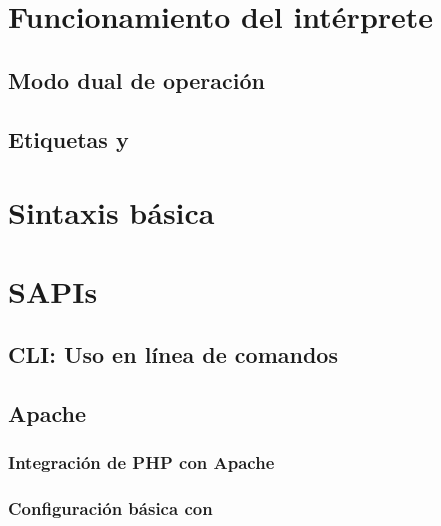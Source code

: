 \documentclass[a4paper,11pt,spanish]{sphinxmanual}
\begin{document}
\section{Funcionamiento del intérprete}
\label{\detokenize{conceptos-basicos-de-php:funcionamiento-del-interprete}}

\subsection{Modo dual de operación}
\label{\detokenize{conceptos-basicos-de-php:modo-dual-de-operacion}}

\subsection{Etiquetas  y }
\label{\detokenize{conceptos-basicos-de-php:etiquetas-php-y}}

\section{Sintaxis básica}
\label{\detokenize{conceptos-basicos-de-php:sintaxis-basica}}

\section{SAPIs}
\label{\detokenize{conceptos-basicos-de-php:sapis}}

\subsection{CLI: Uso en línea de comandos}
\label{\detokenize{conceptos-basicos-de-php:cli-uso-en-linea-de-comandos}}

\subsection{Apache}
\label{\detokenize{conceptos-basicos-de-php:apache}}

\subsubsection{Integración de PHP con Apache}
\label{\detokenize{conceptos-basicos-de-php:integracion-de-php-con-apache}}

\subsubsection{Configuración básica con }
\label{\detokenize{conceptos-basicos-de-php:configuracion-basica-con-php-ini}}
\end{document}
